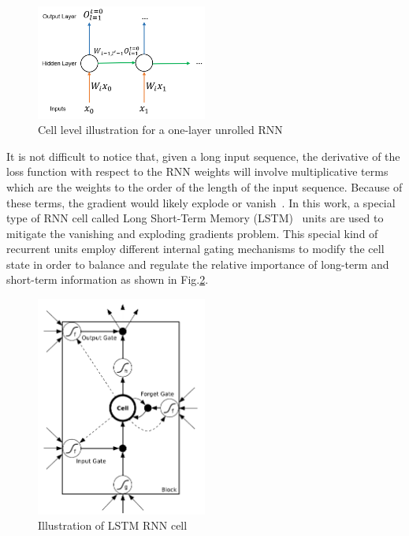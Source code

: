 \begin{figure}[htbp]
  \centering
   \includegraphics[width=0.5\textwidth]{figures/RNN/RNNIlustration.png}
\caption{Cell level illustration for a one-layer unrolled RNN}
  \label{fig:rnn_ilustration}
\end{figure}



It is not difficult to notice that, given a long input sequence, the derivative of the loss function with respect to the RNN weights will involve multiplicative terms which are the weights to the order of the length of the input sequence. Because of these terms, the gradient would likely explode or vanish~\cite{hochreiter1991untersuchungen,Bengio:1994:LLD:2325857.2328340,DBLP:journals/corr/abs-1211-5063}. In this work, a special type of RNN cell called Long Short-Term Memory (LSTM)~\cite{ref:LSTM} units are used to mitigate the vanishing and exploding gradients problem. This special kind of recurrent units employ different internal gating mechanisms to modify the cell state in order to balance and regulate the relative importance of long-term and short-term information as shown in Fig.\ref{fig:lstm_cell}. 


\begin{figure}[htbp]
  \centering
   \includegraphics[width=0.5\textwidth]{figures/RNN/LSTM.png}
\caption{Illustration of LSTM RNN cell \cite{ref:RNNthesis}}
  \label{fig:lstm_cell}
\end{figure}
